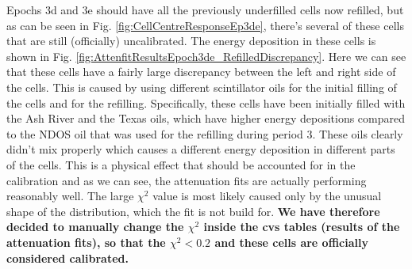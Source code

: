 Epochs 3d and 3e should have all the previously underfilled cells now refilled, but as can be seen in Fig. \ref{fig:CellCentreResponseEp3de}, there's several of these cells that are still (officially) uncalibrated. The energy deposition in these cells is shown in Fig. \ref{fig:AttenfitResultsEpoch3de_RefilledDiscrepancy}. Here we can see that these cells have a fairly large discrepancy between the left and right side of the cells. This is caused by using different scintillator oils for the initial filling of the cells and for the refilling. Specifically, these cells have been initially filled with the Ash River and the Texas oils, which have higher energy depositions compared to the NDOS oil that was used for the refilling during period 3. These oils clearly didn't mix properly which causes a different energy deposition in different parts of the cells. This is a physical effect that should be accounted for in the calibration and as we can see, the attenuation fits are actually performing reasonably well. The large $\chi^2$ value is most likely caused only by the unusual shape of the distribution, which the fit is not build for. \textbf{We have therefore decided to manually change the $\chi^2$ inside the cvs tables (results of the attenuation fits), so that the $\chi^2<0.2$ and these cells are officially considered calibrated.}

